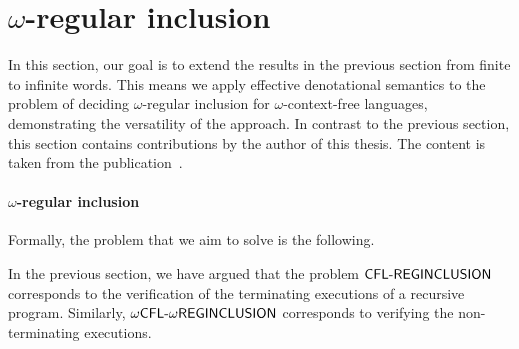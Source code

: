 \documentclass[../../diss.tex]{subfiles}
\begin{document}
\section{\texorpdfstring{$\omega$}{Omega}-regular inclusion}%
\label{Section:EDSOmegaRegIncl}%

In this section, our goal is to extend the results in the previous section from finite to infinite words.
This means we apply effective denotational semantics to the problem of deciding $\omega$-regular inclusion for $\omega$-context-free languages, demonstrating the versatility of the approach.
In contrast to the previous section, this section contains contributions by the author of this thesis.
The content is taken from the publication~\cite{MeyerMN17a}.

\paragraph{$\omega$-regular inclusion}

Formally, the problem that we aim to solve is the following.

\begin{problem}
    \problemshort{($\OCFLINOREG$)}
\end{problem}

In the previous section, we have argued that the problem $\mathsf{CFL\text{-}REGINCLUSION}$ corresponds to the verification of the terminating executions of a recursive program.
Similarly, $\OCFLINOREG$ corresponds to verifying the non-terminating executions.
\end{document}
